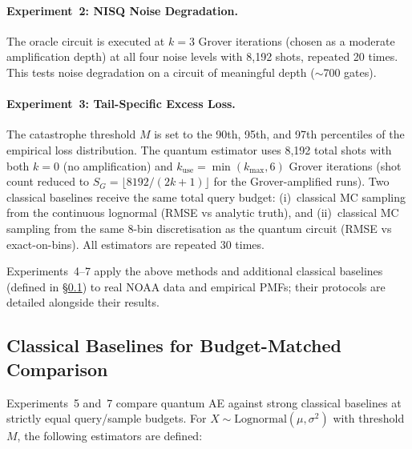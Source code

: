 \documentclass[11pt,a4paper]{article}
\begin{document}
\paragraph{Experiment~2: NISQ Noise Degradation.} The oracle circuit is executed at $k=3$ Grover iterations (chosen as a moderate amplification depth) at all four noise levels with 8,192 shots, repeated 20 times. This tests noise degradation on a circuit of meaningful depth ($\sim$700 gates).

\paragraph{Experiment~3: Tail-Specific Excess Loss.} The catastrophe threshold $M$ is set to the 90th, 95th, and 97th percentiles of the empirical loss distribution. The quantum estimator uses 8,192 total shots with both $k=0$ (no amplification) and $k_{\text{use}} = \min(k_{\max}, 6)$ Grover iterations (shot count reduced to $S_G = \lfloor 8192/(2k+1)\rfloor$ for the Grover-amplified runs). Two classical baselines receive the same total query budget: (i)~classical MC sampling from the continuous lognormal (RMSE vs analytic truth), and (ii)~classical MC sampling from the same 8-bin discretisation as the quantum circuit (RMSE vs exact-on-bins). All estimators are repeated 30 times.

Experiments~4--7 apply the above methods and additional classical baselines (defined in \S\ref{sec:baselines}) to real NOAA data and empirical PMFs; their protocols are detailed alongside their results.

\subsection{Classical Baselines for Budget-Matched Comparison}
\label{sec:baselines}

Experiments~5 and~7 compare quantum AE against strong classical baselines at strictly equal query/sample budgets. For $X \sim \text{Lognormal}(\mu, \sigma^2)$ with threshold $M$, the following estimators are defined:
\end{document}
